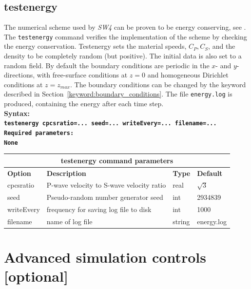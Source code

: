 \documentclass[11pt]{report}
\begin{document}
\subsection{testenergy}
\begin{flushleft}
The numerical scheme used by \emph{SW4} can be proven to be energy conserving, see \cite{SjoPet-12}.
The {\tt testenergy} command verifies the implementation of the scheme by checking the energy
conservation.  Testenergy sets the material speeds, $C_P,C_S$, and the density to be completely
random (but positive). The initial data is also set to a random field.  By default the boundary
conditions are periodic in the $x$- and $y$-directions, with free-surface conditions at $z=0$ and
homogeneous Dirichlet conditions at $z=z_{max}$. The boundary conditions can be changed by the
keyword described in Section~\ref{keyword:boundary_conditions}.  The file \verb+energy.log+ is
produced, containing the energy after each time step.  \\ \bf Syntax:\\ \tt testenergy
cpcsratio=... seed=... writeEvery=... filename=...  \\ \bf Required parameters:\\ \rm None
\end{flushleft}
\begin{center}
\begin{tabular}{|l|p{8cm}|l|l|} \hline
\multicolumn{4}{|c|}{\bf testenergy command parameters}\\ \hline
\bf{Option} & \bf{Description} & \bf{Type} & \bf{Default} \\ \hline \hline
cpcsratio   & P-wave velocity to S-wave velocity ratio & real & $\sqrt{3}$ \\ \hline
seed   & Pseudo-random number generator seed & int & 2934839 \\ \hline
writeEvery  & frequency for saving log file to disk & int & 1000 \\ \hline
filename  & name of log file & string & energy.log \\ \hline
\end{tabular}
\end{center}


\section{Advanced simulation controls [optional]}
\end{document}
